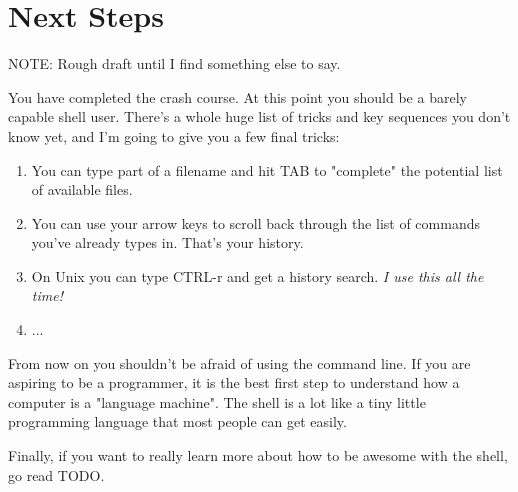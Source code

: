 \chapter{Next Steps}

NOTE: Rough draft until I find something else to say.

You have completed the crash course.  At this point you should be a 
barely capable shell user.  There's a whole huge list of tricks and key
sequences you don't know yet, and I'm going to give you a few final
tricks:

\begin{enumerate}
\item You can type part of a filename and hit TAB to "complete" the potential
    list of available files.
\item You can use your arrow keys to scroll back through the list of commands
    you've already types in.  That's your history.
\item On Unix you can type CTRL-r and get a history search.  \emph{I use this
    all the time!}
\item ...
\end{enumerate}

From now on you shouldn't be afraid of using the command line.  If you are
aspiring to be a programmer, it is the best first step to understand how
a computer is a "language machine".  The shell is a lot like a tiny little
programming language that most people can get easily.

Finally, if you want to really learn more about how to be awesome
with the shell, go read TODO.
